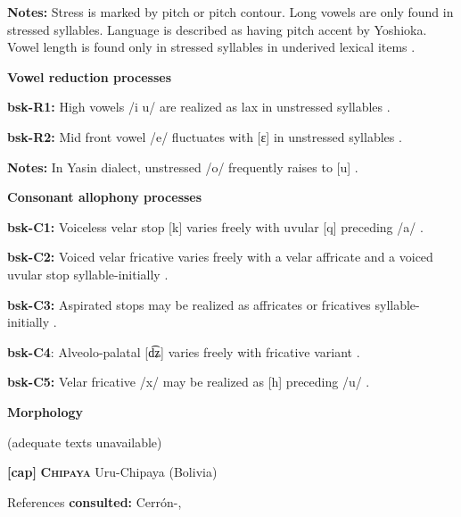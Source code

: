 \textbf{Notes:} Stress is marked by pitch or pitch contour. Long vowels are only found in stressed syllables. Language is described as having pitch accent by Yoshioka. Vowel length is found only in stressed syllables in underived lexical items \citep{Anderson1028}.



\textbf{Vowel reduction processes}



\textbf{bsk-R1:} High vowels /i u/ are realized as lax in unstressed syllables \citep[1029]{Anderson1997}.



\textbf{bsk-R2:} Mid front vowel /e/ fluctuates with [ɛ] in unstressed syllables \citep[1029]{Anderson1997}.



\textbf{Notes:} In Yasin dialect, unstressed /o/ frequently raises to [u] \citep[1038]{Anderson1997}.



\textbf{Consonant allophony processes}



\textbf{bsk-C1:} Voiceless velar stop [k] varies freely with uvular [q] preceding /a/ \citep[1025]{Anderson1997}.



\textbf{bsk-C2:} Voiced velar fricative varies freely with a velar affricate and a voiced uvular stop syllable-initially \citep[1025]{Anderson1997}.



\textbf{bsk-C3:} Aspirated stops may be realized as affricates or fricatives syllable-initially \citep[1025]{Anderson1997}.



\textbf{bsk-C4}: Alveolo-palatal [d͡ʑ] varies freely with fricative variant \citep[1025]{Anderson1997}.



\textbf{bsk-C5:} Velar fricative /x/ may be realized as [h] preceding /u/ \citep[1025]{Anderson1997}.



\textbf{Morphology}



(adequate texts unavailable)



\textbf{[cap]}   \textbf{\textsc{Chipaya}}  Uru-Chipaya (Bolivia)



References \textbf{consulted:} Cerrón-\citet{Palomino2006}, \citet{Olson1967}



